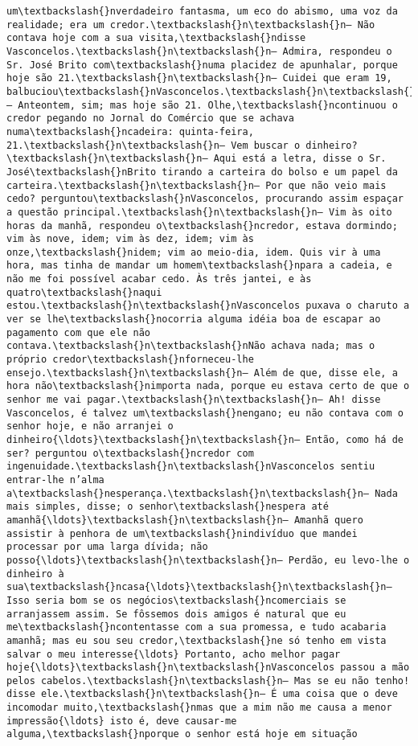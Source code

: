 \begin{Verbatim}[commandchars=\\\{\}]
um\textbackslash{}nverdadeiro fantasma, um eco do abismo, uma voz da realidade; era um credor.\textbackslash{}n\textbackslash{}n— Não contava hoje com a sua visita,\textbackslash{}ndisse Vasconcelos.\textbackslash{}n\textbackslash{}n— Admira, respondeu o Sr. José Brito com\textbackslash{}numa placidez de apunhalar, porque hoje são 21.\textbackslash{}n\textbackslash{}n— Cuidei que eram 19, balbuciou\textbackslash{}nVasconcelos.\textbackslash{}n\textbackslash{}n— Anteontem, sim; mas hoje são 21. Olhe,\textbackslash{}ncontinuou o credor pegando no Jornal do Comércio que se achava numa\textbackslash{}ncadeira: quinta-feira, 21.\textbackslash{}n\textbackslash{}n— Vem buscar o dinheiro?\textbackslash{}n\textbackslash{}n— Aqui está a letra, disse o Sr. José\textbackslash{}nBrito tirando a carteira do bolso e um papel da carteira.\textbackslash{}n\textbackslash{}n— Por que não veio mais cedo? perguntou\textbackslash{}nVasconcelos, procurando assim espaçar a questão principal.\textbackslash{}n\textbackslash{}n— Vim às oito horas da manhã, respondeu o\textbackslash{}ncredor, estava dormindo; vim às nove, idem; vim às dez, idem; vim às onze,\textbackslash{}nidem; vim ao meio-dia, idem. Quis vir à uma hora, mas tinha de mandar um homem\textbackslash{}npara a cadeia, e não me foi possível acabar cedo. Às três jantei, e às quatro\textbackslash{}naqui estou.\textbackslash{}n\textbackslash{}nVasconcelos puxava o charuto a ver se lhe\textbackslash{}nocorria alguma idéia boa de escapar ao pagamento com que ele não contava.\textbackslash{}n\textbackslash{}nNão achava nada; mas o próprio credor\textbackslash{}nforneceu-lhe ensejo.\textbackslash{}n\textbackslash{}n— Além de que, disse ele, a hora não\textbackslash{}nimporta nada, porque eu estava certo de que o senhor me vai pagar.\textbackslash{}n\textbackslash{}n— Ah! disse Vasconcelos, é talvez um\textbackslash{}nengano; eu não contava com o senhor hoje, e não arranjei o dinheiro{\ldots}\textbackslash{}n\textbackslash{}n— Então, como há de ser? perguntou o\textbackslash{}ncredor com ingenuidade.\textbackslash{}n\textbackslash{}nVasconcelos sentiu entrar-lhe n’alma a\textbackslash{}nesperança.\textbackslash{}n\textbackslash{}n— Nada mais simples, disse; o senhor\textbackslash{}nespera até amanhã{\ldots}\textbackslash{}n\textbackslash{}n— Amanhã quero assistir à penhora de um\textbackslash{}nindivíduo que mandei processar por uma larga dívida; não posso{\ldots}\textbackslash{}n\textbackslash{}n— Perdão, eu levo-lhe o dinheiro à sua\textbackslash{}ncasa{\ldots}\textbackslash{}n\textbackslash{}n— Isso seria bom se os negócios\textbackslash{}ncomerciais se arranjassem assim. Se fôssemos dois amigos é natural que eu me\textbackslash{}ncontentasse com a sua promessa, e tudo acabaria amanhã; mas eu sou seu credor,\textbackslash{}ne só tenho em vista salvar o meu interesse{\ldots} Portanto, acho melhor pagar hoje{\ldots}\textbackslash{}n\textbackslash{}nVasconcelos passou a mão pelos cabelos.\textbackslash{}n\textbackslash{}n— Mas se eu não tenho! disse ele.\textbackslash{}n\textbackslash{}n— É uma coisa que o deve incomodar muito,\textbackslash{}nmas que a mim não me causa a menor impressão{\ldots} isto é, deve causar-me alguma,\textbackslash{}nporque o senhor está hoje em situação 
\end{Verbatim}
